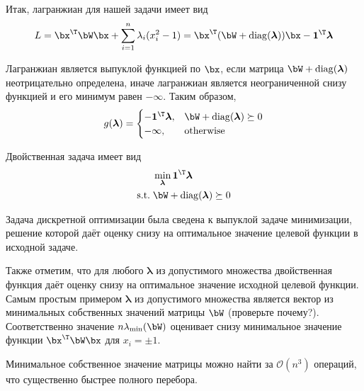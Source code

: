 \documentclass[12pt]{article}
\newcommand{\blambda}{\boldsymbol{\lambda}}
\begin{document}
\begin{enumerate}
Итак, лагранжиан  для нашей задачи имеет вид
\[
L = \bx^{\T}\bW\bx + \sum_{i=1}^n \lambda_i(x_i^2 - 1) = \bx^{\T}(\bW + \mathrm{diag} (\blambda))\bx - \mathbf{1}^{\T}\blambda
\]

Лагранжиан является выпуклой функцией по $\bx$, если матрица $\bW + \mathrm{diag} (\blambda)$ неотрицательно определена, иначе лагранжиан является неограниченной снизу функцией и его минимум равен $-\infty$.
Таким образом, 
\[
g(\blambda) = 
\begin{cases}
- \mathbf{1}^{\T}\blambda, & \bW + \mathrm{diag} (\blambda) \succeq 0\\
-\infty, & \text{otherwise}
\end{cases}
\]

Двойственная задача имеет вид
\begin{equation*}
\begin{split}
& \min_{\blambda} \mathbf{1}^{\T}\blambda\\
\mathrm{s.t.} \; & \bW + \mathrm{diag} (\blambda) \succeq 0
\end{split}
\end{equation*}

Задача дискретной оптимизации была сведена к выпуклой задаче минимизации, решение которой даёт оценку снизу на оптимальное значение целевой функции в исходной задаче.

Также отметим, что для любого $\blambda$ из допустимого множества двойственная функция даёт оценку снизу на оптимальное значение исходной целевой функции.
Самым простым примером $\blambda$ из допустимого множества является вектор из минимальных собственных значений матрицы $\bW$ (проверьте почему?).
Соответственно значение $n\lambda_{\min}(\bW)$ оценивает снизу минимальное значение функции $\bx^{\T}\bW\bx$ для $x_i = \pm 1$.

Минимальное собственное значение матрицы можно найти за $\mathcal{O}(n^3)$ операций, что существенно быстрее полного перебора.
\end{enumerate}
\end{document}
